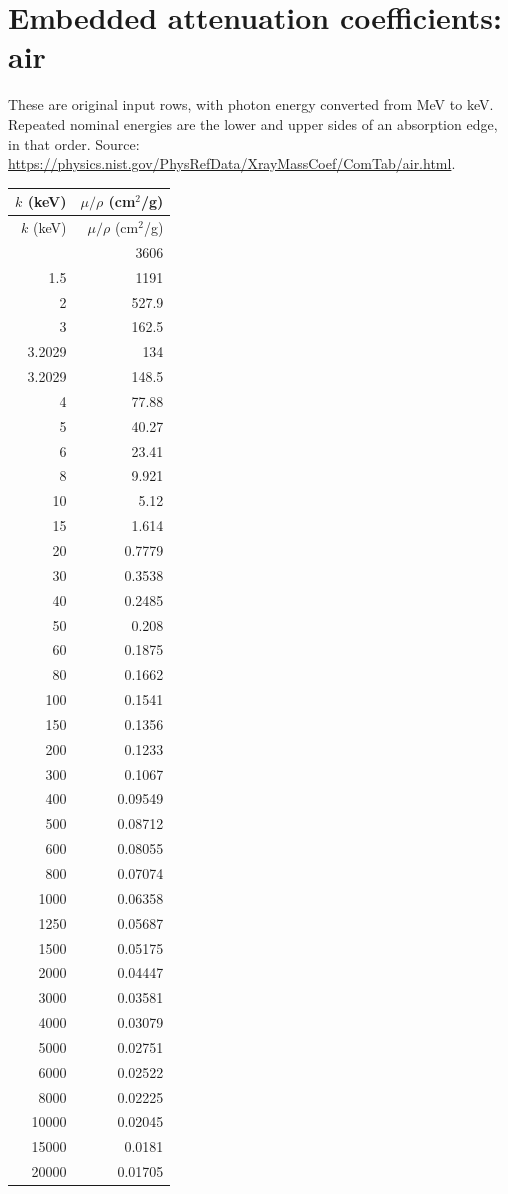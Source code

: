 \documentclass[10pt,a4paper]{article}
\begin{document}
\section{Embedded attenuation coefficients: air}
These are original input rows, with photon energy converted from MeV to keV. Repeated nominal energies are the lower and upper sides of an absorption edge, in that order. Source: \url{https://physics.nist.gov/PhysRefData/XrayMassCoef/ComTab/air.html}.
\small
\begin{longtable}{rr}
\toprule
$k$ (keV) & $\mu/\rho$ (cm$^2$/g) \\
\midrule
\endfirsthead
\toprule
$k$ (keV) & $\mu/\rho$ (cm$^2$/g) \\
\midrule
\endhead
\bottomrule
\endfoot
1 & 3606 \\
1.5 & 1191 \\
2 & 527.9 \\
3 & 162.5 \\
3.2029 & 134 \\
3.2029 & 148.5 \\
4 & 77.88 \\
5 & 40.27 \\
6 & 23.41 \\
8 & 9.921 \\
10 & 5.12 \\
15 & 1.614 \\
20 & 0.7779 \\
30 & 0.3538 \\
40 & 0.2485 \\
50 & 0.208 \\
60 & 0.1875 \\
80 & 0.1662 \\
100 & 0.1541 \\
150 & 0.1356 \\
200 & 0.1233 \\
300 & 0.1067 \\
400 & 0.09549 \\
500 & 0.08712 \\
600 & 0.08055 \\
800 & 0.07074 \\
1000 & 0.06358 \\
1250 & 0.05687 \\
1500 & 0.05175 \\
2000 & 0.04447 \\
3000 & 0.03581 \\
4000 & 0.03079 \\
5000 & 0.02751 \\
6000 & 0.02522 \\
8000 & 0.02225 \\
10000 & 0.02045 \\
15000 & 0.0181 \\
20000 & 0.01705 \\
\end{longtable}
\normalsize
\clearpage
\end{document}
